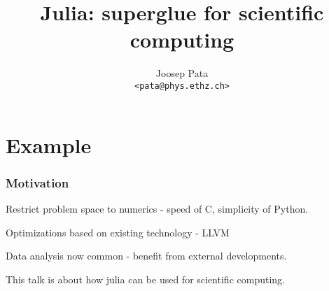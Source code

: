 \documentclass[16pt]{beamer}
\author[Joosep Pata]{Joosep Pata\\ \texttt{<pata@phys.ethz.ch>}}
\institute[ETHz]{ETH Zürich, Institute of Particle Physics}
\title{Julia: superglue for scientific computing}
\begin{document}
\frame{

\titlepage

}


\section{Example}


\begin{frame}[fragile]
\frametitle{Motivation}

\begin{center}
Restrict problem space to numerics - speed of C, simplicity of Python.
\end{center}

\vspace{.3cm}
\begin{center}
Optimizations based on existing technology - LLVM
\end{center}

\vspace{.3cm}
\begin{center}
Data analysis now common - benefit from external developments.
\end{center}

\vspace{.3cm}
\begin{center}
This talk is about how julia can be used for scientific computing.
\end{center}


\end{frame}
\end{document}
